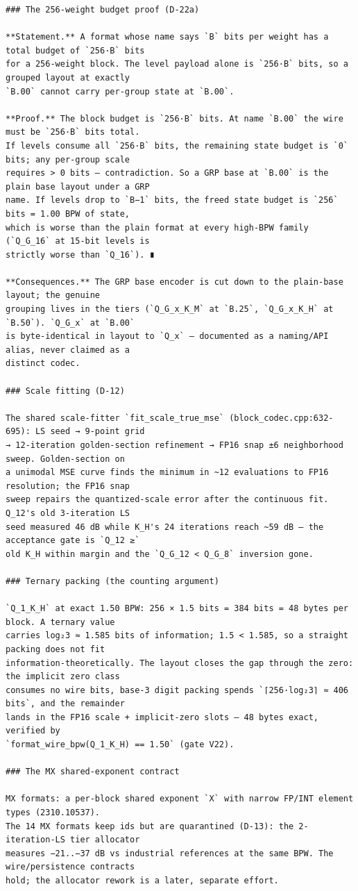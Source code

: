 \begin{Verbatim}[breaklines,breakanywhere,fontsize=\footnotesize]
### The 256-weight budget proof (D-22a)

**Statement.** A format whose name says `B` bits per weight has a total budget of `256·B` bits
for a 256-weight block. The level payload alone is `256·B` bits, so a grouped layout at exactly
`B.00` cannot carry per-group state at `B.00`.

**Proof.** The block budget is `256·B` bits. At name `B.00` the wire must be `256·B` bits total.
If levels consume all `256·B` bits, the remaining state budget is `0` bits; any per-group scale
requires > 0 bits — contradiction. So a GRP base at `B.00` is the plain base layout under a GRP
name. If levels drop to `B−1` bits, the freed state budget is `256` bits = 1.00 BPW of state,
which is worse than the plain format at every high-BPW family (`Q_G_16` at 15-bit levels is
strictly worse than `Q_16`). ∎

**Consequences.** The GRP base encoder is cut down to the plain-base layout; the genuine
grouping lives in the tiers (`Q_G_x_K_M` at `B.25`, `Q_G_x_K_H` at `B.50`). `Q_G_x` at `B.00`
is byte-identical in layout to `Q_x` — documented as a naming/API alias, never claimed as a
distinct codec.

### Scale fitting (D-12)

The shared scale-fitter `fit_scale_true_mse` (block_codec.cpp:632-695): LS seed → 9-point grid
→ 12-iteration golden-section refinement → FP16 snap ±6 neighborhood sweep. Golden-section on
a unimodal MSE curve finds the minimum in ~12 evaluations to FP16 resolution; the FP16 snap
sweep repairs the quantized-scale error after the continuous fit. Q_12's old 3-iteration LS
seed measured 46 dB while K_H's 24 iterations reach ~59 dB — the acceptance gate is `Q_12 ≥`
old K_H within margin and the `Q_G_12 < Q_G_8` inversion gone.

### Ternary packing (the counting argument)

`Q_1_K_H` at exact 1.50 BPW: 256 × 1.5 bits = 384 bits = 48 bytes per block. A ternary value
carries log₂3 ≈ 1.585 bits of information; 1.5 < 1.585, so a straight packing does not fit
information-theoretically. The layout closes the gap through the zero: the implicit zero class
consumes no wire bits, base-3 digit packing spends `⌈256·log₂3⌉ ≈ 406 bits`, and the remainder
lands in the FP16 scale + implicit-zero slots — 48 bytes exact, verified by
`format_wire_bpw(Q_1_K_H) == 1.50` (gate V22).

### The MX shared-exponent contract

MX formats: a per-block shared exponent `X` with narrow FP/INT element types (2310.10537).
The 14 MX formats keep ids but are quarantined (D-13): the 2-iteration-LS tier allocator
measures −21..−37 dB vs industrial references at the same BPW. The wire/persistence contracts
hold; the allocator rework is a later, separate effort.


\end{Verbatim}
